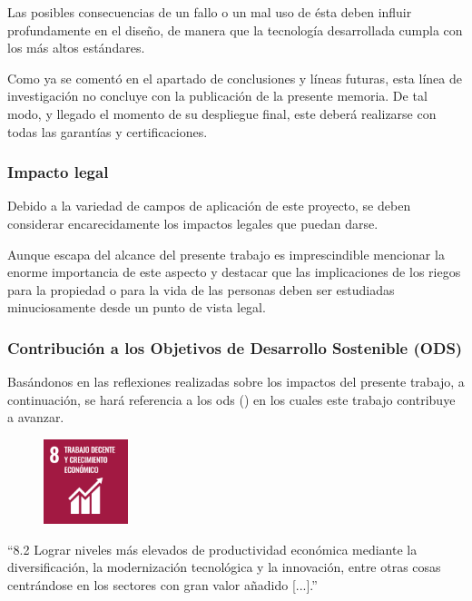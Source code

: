 \documentclass[a4paper, 12pt, spanish, twoside]{article}
\begin{document}
Las posibles consecuencias de un fallo o un mal uso de ésta deben influir profundamente en el diseño, de manera que la tecnología desarrollada cumpla con los más altos estándares. 

Como ya se comentó en el apartado de conclusiones y líneas futuras, esta línea de investigación no concluye con la publicación de la presente memoria. De tal modo, y llegado el momento de su despliegue final, este deberá realizarse con todas las garantías y certificaciones. 


\subsubsection{Impacto legal} \label{sec:anexo1:legal} 

Debido a la variedad de campos de aplicación de este proyecto, se deben considerar encarecidamente los impactos legales que puedan darse. 

Aunque escapa del alcance del presente trabajo es imprescindible mencionar la enorme importancia de este aspecto y destacar que las implicaciones de los riegos para la propiedad o para la vida de las personas deben ser estudiadas minuciosamente desde un punto de vista legal. 


\subsubsection{Contribución a los Objetivos de Desarrollo Sostenible (ODS)} \label{sec:anexo1:ods} 

Basándonos en las reflexiones realizadas sobre los impactos del presente trabajo, a continuación, se hará referencia a los \acrfull{ods} (\cite{Agenda2030}) en los cuales este trabajo contribuye a avanzar. 

\begin{figure}
    \vspace{-\baselineskip}
    \includegraphics[width=0.22\textwidth]{ods/S-WEB-Goal-08.png}
\end{figure} 

“8.2 Lograr niveles más elevados de productividad económica mediante la diversificación, la modernización tecnológica y la innovación, entre otras cosas centrándose en los sectores con gran valor añadido [...].” 
 
\end{document}
